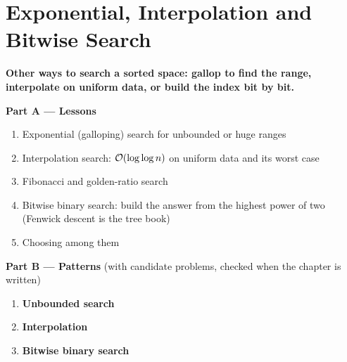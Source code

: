 \chapter{Exponential, Interpolation and Bitwise Search}
\label{ch:search_variants}

\begin{tcolorbox}[enhanced, colback=white, colframe=secondaryblue, boxrule=1pt, arc=2mm]
\textbf{\large\textcolor{primaryblue}{Other ways to search a sorted space: gallop to find the range, interpolate on uniform data, or build the index bit by bit.}}
\end{tcolorbox}


\begin{plannedbox}
\textbf{Part A --- Lessons}
\begin{enumerate}[leftmargin=*, label=\textbf{A\arabic*.}, itemsep=1pt]
    \item Exponential (galloping) search for unbounded or huge ranges
    \item Interpolation search: $\mathcal{O}(\log\log n)$ on uniform data and its worst case
    \item Fibonacci and golden-ratio search
    \item Bitwise binary search: build the answer from the highest power of two (Fenwick descent is the tree book)
    \item Choosing among them
\end{enumerate}
\textbf{Part B --- Patterns} (with candidate problems, checked when the chapter is written)
\begin{enumerate}[leftmargin=*, label=\textbf{P\arabic*.}, itemsep=1pt]
    \item \textbf{Unbounded search}
    \item \textbf{Interpolation}
    \item \textbf{Bitwise binary search}
\end{enumerate}
\end{plannedbox}
